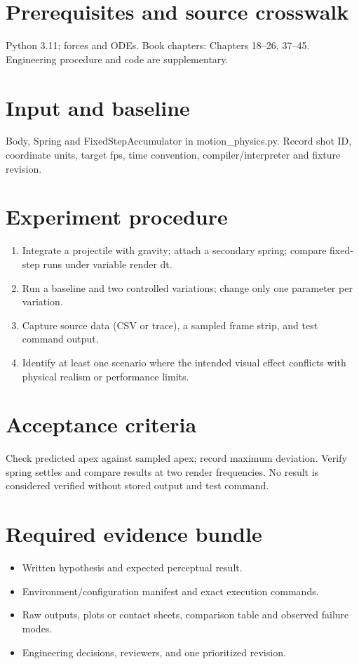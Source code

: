 \documentclass[10pt,letterpaper]{article}
\begin{document}
\makedoctitle
\makedocsummary

\section{Prerequisites and source crosswalk}
Python 3.11; forces and ODEs. Book chapters: Chapters 18--26, 37--45. Engineering procedure and code are supplementary.
\section{Input and baseline}
Body, Spring and FixedStepAccumulator in motion\_physics.py. Record shot ID, coordinate units, target fps, time convention, compiler/interpreter and fixture revision.
\section{Experiment procedure}
\begin{enumerate}
\item Integrate a projectile with gravity; attach a secondary spring; compare fixed-step runs under variable render dt.
\item Run a baseline and two controlled variations; change only one parameter per variation.
\item Capture source data (CSV or trace), a sampled frame strip, and test command output.
\item Identify at least one scenario where the intended visual effect conflicts with physical realism or performance limits.
\end{enumerate}
\section{Acceptance criteria}
Check predicted apex against sampled apex; record maximum deviation. Verify spring settles and compare results at two render frequencies. No result is considered verified without stored output and test command.
\section{Required evidence bundle}
\begin{itemize}
\item Written hypothesis and expected perceptual result.
\item Environment/configuration manifest and exact execution commands.
\item Raw outputs, plots or contact sheets, comparison table and observed failure modes.
\item Engineering decisions, reviewers, and one prioritized revision.
\end{itemize}
\end{document}
